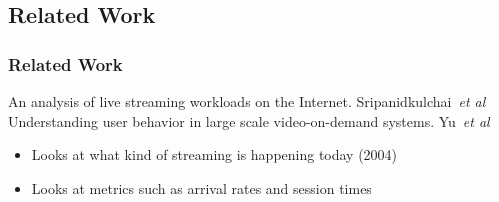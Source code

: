 \documentclass[xcolor=pdftex,dvipsnames,table]{beamer}
\begin{document}
\subsection{Related Work}

\begin{frame}
    \frametitle{Related Work}


%
%
%

    {\footnotesize

        An analysis of live streaming workloads on the Internet. Sripanidkulchai~{\it et al}\\
        Understanding user behavior in large scale video-on-demand systems. Yu~{\it et al}
        \begin{itemize}
            \item Looks at what kind of streaming is happening today (2004)
            \item Looks at metrics such as arrival rates and session times
        \end{itemize}~\\

}
\end{frame}
\end{document}
